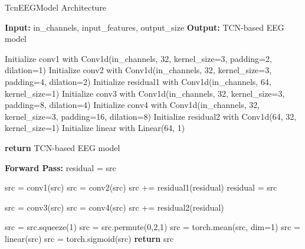 \documentclass[10pt]{article}
\begin{document}
\begin{algorithm}[H]
  \caption{TcnEEGModel Architecture}
  \begin{algorithmic}[1]
      \State \textbf{Input:} in\_channels, input\_features, output\_size
      \State \textbf{Output:} TCN-based EEG model
      
      \State Initialize conv1 with Conv1d(in\_channels, 32, kernel\_size=3, padding=2, dilation=1)
      \State Initialize conv2 with Conv1d(in\_channels, 32, kernel\_size=3, padding=4, dilation=2)
      \State Initialize residual1 with Conv1d(in\_channels, 64, kernel\_size=1)
      \State Initialize conv3 with Conv1d(in\_channels, 32, kernel\_size=3, padding=8, dilation=4)
      \State Initialize conv4 with Conv1d(in\_channels, 32, kernel\_size=3, padding=16, dilation=8)
      \State Initialize residual2 with Conv1d(64, 32, kernel\_size=1)
      \State Initialize linear with Linear(64, 1)
      
      \State \textbf{return} TCN-based EEG model

      \State \textbf{Forward Pass:}
      \State \hspace{0.5cm} residual = src
      
      \State \hspace{0.5cm} src = conv1(src)
      \State \hspace{0.5cm} src = conv2(src)
      \State \hspace{0.5cm} src += residual1(residual) 
      \State \hspace{0.5cm} residual = src
      
      \State \hspace{0.5cm} src = conv3(src)
      \State \hspace{0.5cm} src = conv4(src)
      \State \hspace{0.5cm} src += residual2(residual) 
      
      \State \hspace{0.5cm} src = src.squeeze(1)
      \State \hspace{0.5cm} src = src.permute(0,2,1)
      \State \hspace{0.5cm} src = torch.mean(src, dim=1)
      \State \hspace{0.5cm} src = linear(src)
      \State \hspace{0.5cm} src = torch.sigmoid(src)
      \State \hspace{0.5cm} \textbf{return} src 
    \EndProcedure
  \end{algorithmic}
\end{algorithm}
\end{document}
